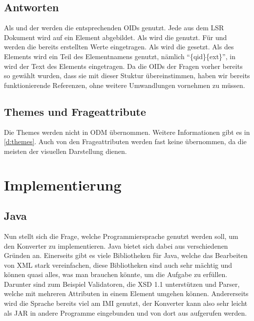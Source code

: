 \subsection{Antworten}

Als  und  der  werden die entsprechenden OIDs genutzt.
Jede  aus dem LSR Dokument wird auf ein  Element abgebildet.
Als  wird die  genutzt.
Für  und  werden die bereits erstellten Werte eingetragen.
Als  wird die  gesetzt.
Als  des  Elements wird ein Teil des Elementnamens genutzt, nämlich \enquote{\{qid\}\{ext\}}, in  wird der Text des Elements eingetragen.
Da die OIDs der Fragen vorher bereits so gewählt wurden, dass sie mit dieser Stuktur übereinstimmen, haben wir bereits funktionierende Referenzen, ohne weitere Umwandlungen vornehmen zu müssen.

\subsection{Themes und Frageattribute}

Die Themes werden nicht in ODM übernommen. Weitere Informationen gibt es in \cref{d:themes}.
Auch von den Frageattributen werden fast keine übernommen, da die meisten der visuellen Darstellung dienen.

\section{Implementierung}

\subsection{Java}

Nun stellt sich die Frage, welche Programmiersprache genutzt werden soll, um den Konverter zu implementieren.
Java bietet sich dabei aus verschiedenen Gründen an.
Einerseits gibt es viele Bibliotheken für Java, welche das Bearbeiten von XML stark vereinfachen, diese Bibliotheken sind auch sehr mächtig und können quasi alles, was man brauchen könnte, um die Aufgabe zu erfüllen.
Darunter sind zum Beispiel Validatoren, die XSD 1.1 unterstützen und Parser, welche mit mehreren Attributen in einem Element umgehen können.
Andererseits wird die Sprache bereits viel am IMI genutzt, der Konverter kann also sehr leicht als JAR in andere Programme eingebunden und von dort aus aufgerufen werden.

